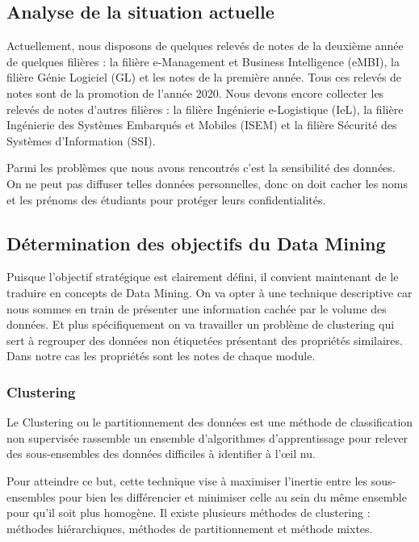 \documentclass{article}
\begin{document}
            \subsection{Analyse de la situation actuelle}
                Actuellement, nous disposons de quelques relevés de notes de la deuxième année de quelques filières : la filière e-Management et Business Intelligence (eMBI), la filière Génie Logiciel (GL) et les notes de la première année. Tous ces relevés de notes sont de la promotion de l’année 2020. Nous devons encore collecter les relevés de notes d’autres filières : la filière Ingénierie e-Logistique (IeL), la filière Ingénierie des Systèmes Embarqués et Mobiles (ISEM) et la filière Sécurité des Systèmes d'Information (SSI).\par
                Parmi les problèmes que nous avons rencontrés c’est la sensibilité des données. On ne peut pas diffuser telles données personnelles, donc on doit cacher les noms et les prénoms des étudiants pour protéger leurs confidentialités.\\
            \subsection{Détermination des objectifs du Data Mining}
                Puisque l’objectif stratégique est clairement défini, il convient maintenant de le traduire en concepts de Data Mining. On va opter à une technique descriptive car nous sommes en train de présenter une information cachée par le volume des données. Et plus spécifiquement on va travailler un problème de clustering qui sert à regrouper des données non étiquetées présentant des propriétés similaires. Dans notre cas les propriétés sont les notes de chaque module.\\
                \subsubsection{Clustering}
                    Le Clustering ou le partitionnement des données est une méthode de classification non supervisée rassemble un ensemble d’algorithmes d’apprentissage pour relever des sous-ensembles des données difficiles à identifier à l’œil nu.\par
                    Pour atteindre ce but, cette technique vise à maximiser l’inertie entre les sous-ensembles pour bien les différencier et minimiser celle au sein du même ensemble pour qu’il soit plus homogène. Il existe plusieurs méthodes de clustering : méthodes hiérarchiques, méthodes de partitionnement et méthode mixtes.\\
\end{document}
